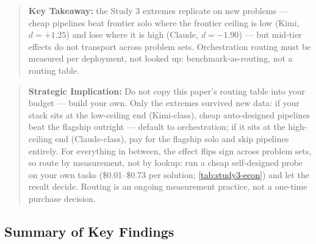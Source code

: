 \documentclass[12pt,a4paper]{article}
\begin{document}
\begin{quote}
\textbf{Key Takeaway:} the Study 3 extremes replicate on new problems ---
cheap pipelines beat frontier solo where the frontier ceiling is low (Kimi,
$d = +1.25$) and lose where it is high (Claude, $d = -1.90$) --- but
mid-tier effects do not transport across problem sets. Orchestration routing
must be measured per deployment, not looked up: benchmark-as-routing, not a
routing table.
\end{quote}

\begin{quote}
\textbf{Strategic Implication:} Do not copy this paper's routing table into
your budget --- build your own. Only the extremes survived new data: if your
stack sits at the low-ceiling end (Kimi-class), cheap auto-designed pipelines
beat the flagship outright --- default to orchestration; if it sits at the
high-ceiling end (Claude-class), pay for the flagship solo and skip pipelines
entirely. For everything in between, the effect flips sign across problem
sets, so route by measurement, not by lookup: run a cheap self-designed probe
on your own tasks (\$0.01--\$0.73 per solution;
\cref{tab:study3-econ}) and let the result decide. Routing is an ongoing
measurement practice, not a one-time purchase decision.
\end{quote}

\subsection{Summary of Key Findings}
\end{document}
